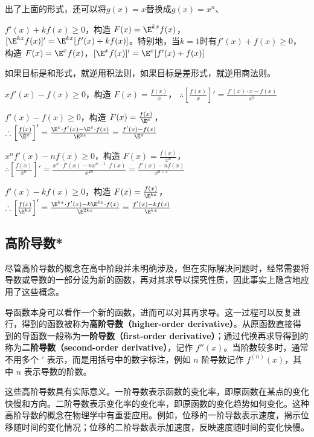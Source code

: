出了上面的形式，还可以将$g(x)=x$替换成$g(x)=x^n$、

$f'(x) + k f(x) \geq 0$，构造 $F(x) = \E^{kx} f(x)$，$[\E^{kx} f(x)]' = \E^{kx} [f'(x) + kf(x)]$。特别地，当$k=1$时有$f'(x) + f(x) \geq 0$，构造 $F(x) = \E^x f(x)$，$[\E^x f(x)]' = \E^x [f'(x) + f(x)]$

如果目标是和形式，就逆用积法则，如果目标是差形式，就逆用商法则。

$xf'(x) - f(x) \geq 0$，构造 $F(x) = \frac{f(x)}{x}$，  
    $\therefore \left[\frac{f(x)}{x}\right]' = \frac{f'(x) \cdot x - f(x)}{x^2}$

$f'(x) - f(x) \geq 0$，构造 $F(x) = \frac{f(x)}{\E^x}$，  
    $\therefore \left[\frac{f(x)}{\E^x}\right]' = \frac{\E^x \cdot f'(x) - \E^x \cdot f(x)}{\E^{2x}} = \frac{f'(x) - f(x)}{\E^x}$

$x^n f'(x) - n f(x) \geq 0$，构造 $F(x) = \frac{f(x)}{x^n}$，  
    $\therefore \left[\frac{f(x)}{x^n}\right]' = \frac{x^n \cdot f'(x) - n x^{n-1} \cdot f(x)}{x^{2n}} = \frac{f'(x) - n f(x)}{x^{n+1}}$

$f'(x) - k f(x) \geq 0$，构造 $F(x) = \frac{f(x)}{\E^{kx}}$，  
    $\therefore \left[\frac{f(x)}{\E^{kx}}\right]' = \frac{\E^{kx} \cdot f'(x) - k \E^{kx} \cdot f(x)}{\E^{2kx}} = \frac{f'(x) - k f(x)}{\E^{kx}}$

\subsection{高阶导数*}


尽管高阶导数的概念在高中阶段并未明确涉及，但在实际解决问题时，经常需要将导数或导数的一部分设为新的函数，再对其求导以探究性质，因此事实上隐含地应用了这些概念。

导函数本身可以看作一个新的函数，进而可以对其再求导。这一过程可以反复进行，得到的函数被称为\textbf{高阶导数（higher-order derivative）}。从原函数直接得到的导函数一般称为\textbf{一阶导数（first-order derivative）}；通过代换再求导得到的称为\textbf{二阶导数（second-order derivative）}，记作 $f''(x)$。当阶数较多时，通常不用多个 $'$ 表示，而是用括号中的数字标注，例如 $n$ 阶导数记作 $f^{(n)}(x)$，其中 $n$ 表示导数的阶数。

这些高阶导数具有实际意义。一阶导数表示函数的变化率，即原函数在某点的变化快慢和方向。二阶导数表示变化率的变化率，即原函数的变化趋势如何变化。这种高阶导数的概念在物理学中有重要应用。例如，位移的一阶导数表示速度，揭示位移随时间的变化情况；位移的二阶导数表示加速度，反映速度随时间的变化快慢。

